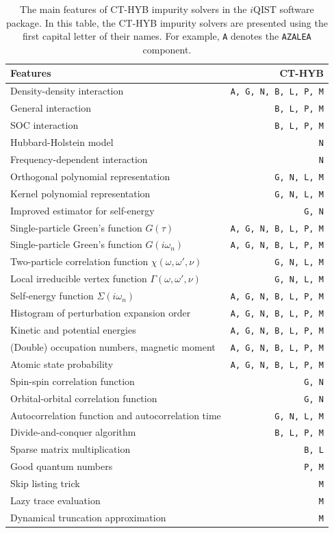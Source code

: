 \begin{table}[tp]
\caption{The main features of CT-HYB impurity solvers in the $i$QIST software package. In this table, the CT-HYB impurity solvers are presented using the first capital letter of their names. For example, \texttt{A} denotes the \texttt{AZALEA} component. \label{tab:feature}}
\centering
\begin{tabular}{lr}
\hline\hline
Features & CT-HYB \\
\hline
Density-density interaction & \texttt{A, G, N, B, L, P, M}\\
General interaction & \texttt{B, L, P, M} \\
SOC interaction & \texttt{B, L, P, M} \\
Hubbard-Holstein model & \texttt{N} \\
Frequency-dependent interaction & \texttt{N} \\
\hline
Orthogonal polynomial representation & \texttt{G, N, L, M} \\
Kernel polynomial representation & \texttt{G, N, L, M} \\
Improved estimator for self-energy & \texttt{G, N} \\
\hline
Single-particle Green's function $G(\tau)$ & \texttt{A, G, N, B, L, P, M} \\
Single-particle Green's function $G(i\omega_n)$ & \texttt{A, G, N, B, L, P, M} \\
Two-particle correlation function $\chi(\omega, \omega', \nu)$ & \texttt{G, N, L, M} \\
Local irreducible vertex function $\Gamma(\omega, \omega', \nu)$ & \texttt{G, N, L, M} \\
Self-energy function $\Sigma(i\omega_n)$ & \texttt{A, G, N, B, L, P, M} \\
Histogram of perturbation expansion order & \texttt{A, G, N, B, L, P, M} \\
Kinetic and potential energies & \texttt{A, G, N, B, L, P, M} \\
(Double) occupation numbers, magnetic moment & \texttt{A, G, N, B, L, P, M} \\
Atomic state probability & \texttt{A, G, N, B, L, P, M} \\
Spin-spin correlation function & \texttt{G, N} \\
Orbital-orbital correlation function & \texttt{G, N} \\
Autocorrelation function and autocorrelation time & \texttt{G, N, L, M} \\
\hline
Divide-and-conquer algorithm & \texttt{B, L, P, M} \\
Sparse matrix multiplication & \texttt{B, L} \\
Good quantum numbers & \texttt{P, M} \\
Skip listing trick & \texttt{M} \\
Lazy trace evaluation & \texttt{M} \\
Dynamical truncation approximation & \texttt{M} \\
\hline\hline
\end{tabular}
\end{table}
